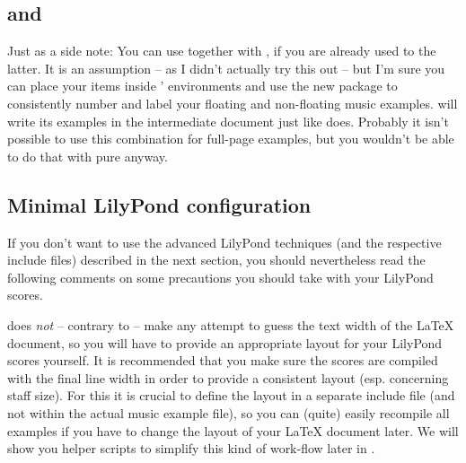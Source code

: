 \documentclass[../openLilyLib]{subfiles}
\begin{document}
\subsection{ and }
\label{subsec:xmp_and-lilypond-book}
Just as a side note: You can use  together with , if you are already used to the latter.
It is an assumption -- as I didn't actually try this out -- but I'm sure you can place your  items inside ' environments and use the new package to consistently number and label your floating and non-floating music examples.
 will write its examples in the intermediate document just like  does.
Probably it isn't possible to use this combination for full-page examples, but you wouldn't be able to do that with pure  anyway.

\subsection{Minimal LilyPond configuration}
\label{subsec:xmp_minimal-lilypond-configuration}
If you don't want to use the advanced LilyPond techniques (and the respective include files) described in the next section, you should nevertheless read the following comments on some precautions you should take with your LilyPond scores.

 does \emph{not} -- contrary to  -- make any attempt to guess the text width of the \LaTeX{} document, so you will have to provide an appropriate layout for your LilyPond scores yourself.
It is recommended that you make sure the scores are compiled with the final line width in order to provide a consistent layout (esp. concerning staff size).
For this it is crucial to define the layout in a separate include file (and not within the actual music example file), so you can (quite) easily recompile all examples if you have to change the layout of your \LaTeX{} document later.
We will show you helper scripts to simplify this kind of work-flow later in .
\end{document}

